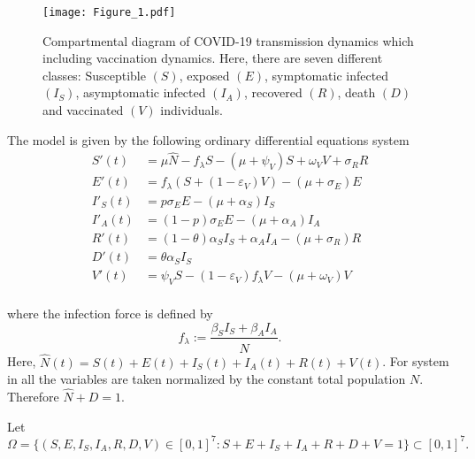 \begin{figure*}[tbh]
    \centering
    \texttt{[image: Figure\_1.pdf]}
    \caption{%
        Compartmental diagram of COVID-19 transmission dynamics which 
        including vaccination dynamics. Here, there are seven different classes: 
        Susceptible $(S)$, exposed $(E)$, symptomatic infected $(I_S)$, asymptomatic 
        infected $(I_A)$, recovered $(R)$, death $(D)$ and vaccinated $(V)$ 
        individuals.}
    \label{Fig:SchemeModel}
\end{figure*}
%
The model is given by the following ordinary differential equations system
%
\begin{equation}\label{model1}
    \begin{aligned}
        S'(t) &= \mu \widehat{N}-f_{\lambda} S - (\mu+\psi_V)S +
        \omega_V V+ \sigma_R R
        \\
        E'(t) &= f_{\lambda}\left(S+
        (1-\varepsilon_V) V\right)-(\mu+\sigma_E) E 
        \\
        I'_S(t) &= 
        p \sigma_E E-(\mu+\alpha_S) I_S
        \\
        I'_A(t) &= (1-p) \sigma_E E-(\mu+\alpha_A) I_A 
        \\
        R'(t)&= (1-\theta) \alpha_S I_S +
        \alpha_A I_A-(\mu+\sigma_R) R 
        \\
        D'(t) &= \theta \alpha_S I_S 
        \\
        V'(t) &= \psi_V S-(1-\varepsilon_V)  
        f_{\lambda}V - (\mu+\omega_V) V
        \\
    \end{aligned}
\end{equation}

where the infection force is defined by
\begin{equation}\label{infection-force}
    f_{\lambda}:=\frac{\beta_S I_S + \beta_AI_A}{\widehat{N}}.
\end{equation}
%
Here, $\widehat{N}(t)=S(t)+E(t)+I_S(t)+I_A(t)+R(t)+V(t)$. For system in
 all the
variables are taken normalized by the constant total population $N$. Therefore
$\widehat{N}+D = 1$.

Let
$$
    \Omega=
        \{
            (S,E,I_S,I_A,R,D,V) \in [0,1]^{7}: 
            S+E+I_S+I_A+R+D+V=1
        \} \subset [0,1]^{7}.
$$

